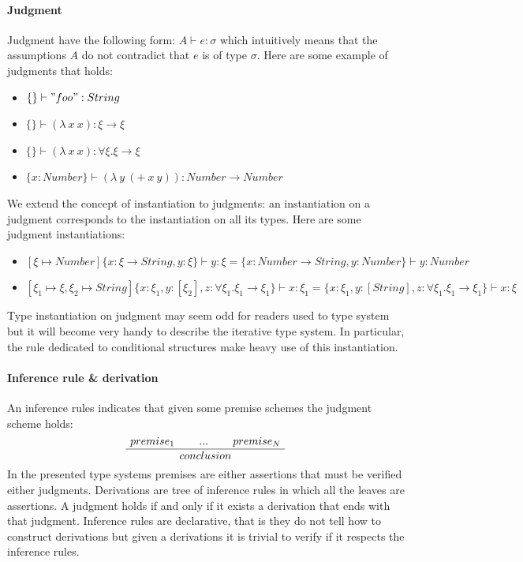\documentclass[a4paper]{report}
\newcommand{\ax}[1]%
{\AxiomC{$#1$}}
\newcommand{\tric}[1]%
{\TrinaryInfC{$#1$}}
\newcommand{\drule}%
{\DisplayProof}
\begin{document}
\paragraph{Judgment} Judgment have the following form: $A\vdash e:\sigma$ which intuitively means that the assumptions $A$ do not contradict that $e$ is of type $\sigma$. Here are some example of judgments that holds:
\begin{itemize}
\item $\{\}\vdash "foo":String$
\item $\{\}\vdash (\lambda\ x\ x):\xi\to\xi$
\item $\{\}\vdash (\lambda\ x\ x):\forall\xi.\xi\to\xi$
\item $\{x:Number\}\vdash (\lambda\ y\ (+\ x\ y)):Number\to Number$
\end{itemize}
We extend the concept of instantiation to judgments: an instantiation on a judgment corresponds to the instantiation on all its types. Here are some judgment instantiations:
\begin{itemize}
\item $\left[\xi\mapsto Number\right]\{x:\xi\to String,y:\xi\}\vdash y:\xi = \{x:Number\to String,y:Number\}\vdash y:Number$
\item $\left[\xi_1\mapsto\xi,\xi_2\mapsto String\right]\{x:\xi_1,y:[\xi_2],z:\forall\xi_1.\xi_1\to\xi_1\}\vdash x:\xi_1=\{x:\xi_1,y:[String],z:\forall\xi_1.\xi_1\to\xi_1\}\vdash x:\xi$
\end{itemize}
Type instantiation on judgment may seem odd for readers used to type system but it will become very handy to describe the iterative type system. In particular, the rule dedicated to conditional structures make heavy use of this instantiation.

\paragraph{Inference rule \& derivation} An inference rules indicates that given some premise schemes the judgment scheme holds:
$$\ax{premise_1}
\ax{...}
\ax{premise_N}
\tric{conclusion}
\drule$$
In the presented type systems premises are either assertions that must be verified either judgments. Derivations are tree of inference rules in which all the leaves are assertions. A judgment holds if and only if it exists a derivation that ends with that judgment. Inference rules are declarative, that is they do not tell how to construct derivations but given a derivations it is trivial to verify if it respects the inference rules.
\end{document}
